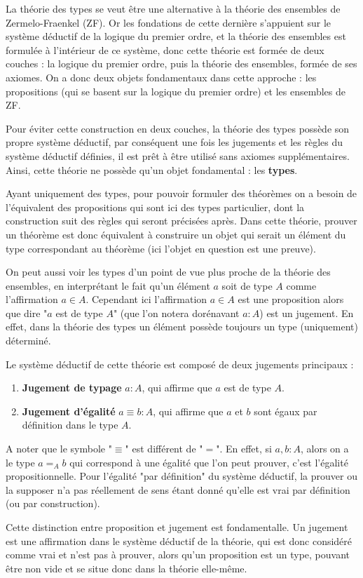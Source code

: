 \documentclass[../main.tex]{subfiles}
\begin{document}
  La théorie des types se veut être une alternative à la théorie des ensembles de Zermelo-Fraenkel (ZF).
  Or les fondations de cette dernière s'appuient sur le système déductif de la logique du premier ordre,
  et la théorie des ensembles est formulée à l'intérieur de ce système, donc cette théorie est formée
  de deux couches : la logique du premier ordre, puis la théorie des ensembles, formée de ses axiomes.
  On a donc deux objets fondamentaux dans cette approche :
  les propositions (qui se basent sur la logique du premier ordre) et les ensembles de ZF.

  Pour éviter cette construction en deux couches, la théorie des types possède son propre système déductif,
  par conséquent une fois les jugements et les règles du système déductif définies,
  il est prêt à être utilisé sans axiomes supplémentaires.
  Ainsi, cette théorie ne possède qu'un objet fondamental : les \textbf{types}.

  Ayant uniquement des types, pour pouvoir formuler des théorèmes on a besoin de l'équivalent des propositions
  qui sont ici des types particulier, dont la construction suit des règles qui seront précisées après.
  Dans cette théorie, prouver un théorème est donc équivalent à construire un objet
  qui serait un élément du type correspondant au théorème (ici l'objet en question est une preuve).

  On peut aussi voir les types d'un point de vue plus proche de la théorie des ensembles,
  en interprétant le fait qu'un élément $a$ soit de type $A$ comme l'affirmation $a \in A$.
  Cependant ici l'affirmation $a \in A$ est une proposition alors que dire "$a$ est de type $A$"
  (que l'on notera dorénavant $a : A$) est un jugement. En effet,
  dans la théorie des types un élément possède toujours un type (uniquement) déterminé.

  Le système déductif de cette théorie est composé de deux jugements principaux :
  \begin{enumerate}
    \item \textbf{Jugement de typage} $a : A$, qui affirme que $a$ est de type $A$.
    \item \textbf{Jugement d'égalité} $a \equiv b : A$, qui affirme que $a$ et $b$ sont égaux par définition dans le type $A$.
  \end{enumerate}
  A noter que le symbole "$\equiv$" est différent de "$=$".
  En effet, si $a, b : A$, alors on a le type $a =_A b$ qui correspond à une égalité
  que l'on peut prouver, c'est l'égalité propositionnelle.
  Pour l'égalité "par définition" du système déductif, la prouver ou la supposer n'a pas réellement de sens
  étant donné qu'elle est vrai par définition (ou par construction).

  Cette distinction entre proposition et jugement est fondamentalle.
  Un jugement est une affirmation dans le système déductif de la théorie, qui est donc considéré comme vrai et n'est pas à prouver,
  alors qu'un proposition est un type, pouvant être non vide et se situe donc dans la théorie elle-même.
\end{document}
